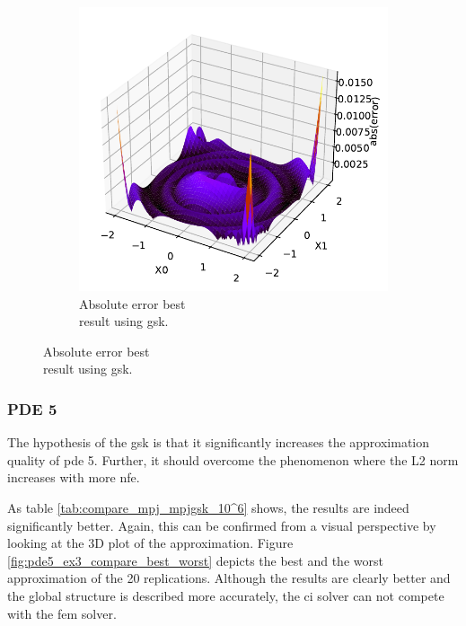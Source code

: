 \documentclass[./\jobname.tex]{subfiles}
\begin{document}
\begin{figure}[H]
\begin{subfigure}[b]{0.4\linewidth}
		\includegraphics[width=1\textwidth]{../../code/experiments/experiment_3/pde0b_ex3_abs_error.pdf}
		\caption{Absolute error best\\ result using \gls{gsk}. }
		\label{fig:pde0b_ex3_abs_error}
	\end{subfigure}%
	\label{fig:compare_abs_error_non_adaptive}
\end{figure}

\subsubsection{PDE 5}

The hypothesis of the \gls{gsk} is that it significantly increases the approximation quality of \gls{pde} 5. Further, it should overcome the phenomenon where the L2 norm increases with more \gls{nfe}. 

As table \ref{tab:compare_mpj_mpjgsk_10^6} shows, the results are indeed significantly better. Again, this can be confirmed from a visual perspective by looking at the 3D plot of the approximation. Figure \ref{fig:pde5_ex3_compare_best_worst} depicts the best and the worst approximation of the 20 replications. Although the results are clearly better and the global structure is described more accurately, the \gls{ci} solver can not compete with the \gls{fem} solver. 
\end{document}
